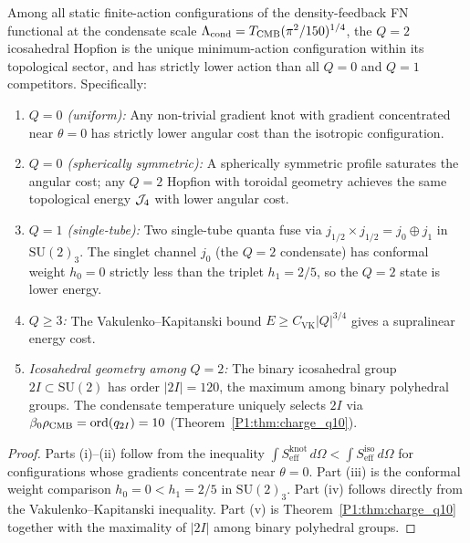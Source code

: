 \begin{theorem}
\label{P1:thm:vacuum}
Among all static finite-action configurations of the density-feedback
FN functional at the condensate scale $\Lambda_{\mathrm{cond}} = T_{\mathrm{CMB}}(\pi^2/150)^{1/4}$,
the $Q=2$ icosahedral Hopfion is the unique minimum-action configuration
within its topological sector, and has strictly lower action than all
$Q=0$ and $Q=1$ competitors.  Specifically:
\begin{enumerate}[noitemsep,label=\emph{(\roman*)}]
  \item \textit{$Q=0$ (uniform):} Any non-trivial gradient
    knot with gradient concentrated near $\theta=0$ has strictly lower
    angular cost than the isotropic configuration.
  \item \textit{$Q=0$ (spherically symmetric):} A spherically symmetric
    profile saturates the angular cost; any $Q=2$ Hopfion with toroidal
    geometry achieves the same topological energy $\mathcal{J}_4$ with lower
    angular cost.
  \item \textit{$Q=1$ (single-tube):} Two single-tube quanta fuse via
    $j_{1/2}\times j_{1/2} = j_0\oplus j_1$ in $\mathrm{SU}(2)_3$.
    The singlet channel $j_0$ (the $Q=2$ condensate) has conformal
    weight $h_0=0$ strictly less than the triplet $h_1 = 2/5$, so the
    $Q=2$ state is lower energy.
  \item \textit{$Q\geq 3$:} The Vakulenko--Kapitanski bound
    $E\geq C_{\mathrm{VK}}|Q|^{3/4}$ gives a supralinear energy cost.
  \item \textit{Icosahedral geometry among $Q=2$:} The binary icosahedral
    group $2I\subset\mathrm{SU}(2)$ has order $|2I|=120$, the maximum
    among binary polyhedral groups.  The condensate temperature uniquely
    selects $2I$ via $\beta_0\rho_{\mathrm{CMB}} = \operatorname{ord}(q_{2I})=10$
    (Theorem~\ref{P1:thm:charge_q10}).
\end{enumerate}
\end{theorem}
\begin{proof}
Parts (i)--(ii) follow from the inequality
$\int S_{\mathrm{eff}}^{\mathrm{knot}}\,d\Omega <
\int S_{\mathrm{eff}}^{\mathrm{iso}}\,d\Omega$
for configurations whose gradients concentrate near $\theta=0$.
Part (iii) is the conformal weight comparison $h_0 = 0 < h_1 = 2/5$
in $\mathrm{SU}(2)_3$.
Part (iv) follows directly from the Vakulenko--Kapitanski inequality.
Part (v) is Theorem~\ref{P1:thm:charge_q10} together with the maximality of
$|2I|$ among binary polyhedral groups.
\end{proof}

